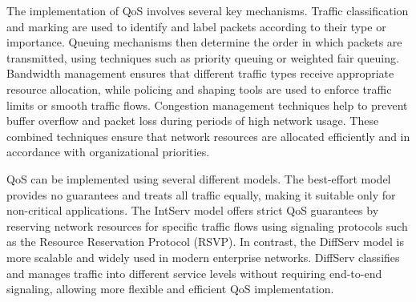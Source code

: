 The implementation of QoS involves several key mechanisms. Traffic classification and marking are used to identify and label packets according to their type or importance. Queuing mechanisms then determine the order in which packets are transmitted, using techniques such as priority queuing or weighted fair queuing. Bandwidth management ensures that different traffic types receive appropriate resource allocation, while policing and shaping tools are used to enforce traffic limits or smooth traffic flows. Congestion management techniques help to prevent buffer overflow and packet loss during periods of high network usage. These combined techniques ensure that network resources are allocated efficiently and in accordance with organizational priorities.\cite{paloalto_networks_what_nodate}\cite{hpe_juniper_networking_what_nodate}\cite{rhim_what_2024}


QoS can be implemented using several different models. The best-effort model provides no guarantees and treats all traffic equally, making it suitable only for non-critical applications.\cite{bruno_wan_2024} The \ac{IntServ} model offers strict QoS guarantees by reserving network resources for specific traffic flows using signaling protocols such as the Resource Reservation Protocol (RSVP).\cite{networklessons_introduction_nodate} In contrast, the \ac{DiffServ} model is more scalable and widely used in modern enterprise networks. DiffServ classifies and manages traffic into different service levels without requiring end-to-end signaling, allowing more flexible and efficient QoS implementation.\cite{bruno_wan_2024}
